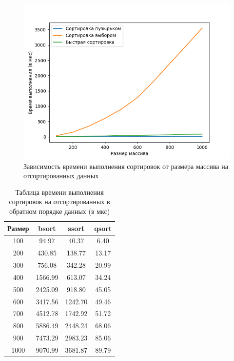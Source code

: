 \documentclass[12pt]{report}
\begin{document}
\begin{figure}[H]
	\centering
	\includegraphics[scale = 0.8]{dir.png}
	\caption{Зависимость времени выполнения сортировок от размера массива на отсортированных данных}
	\label{fig:mpr1}
\end{figure}

\begin{table} [H]
	\caption{Таблица времени выполнения сортировок на отсортированных в  обратном порядке данных (в мкс)}
	\label{t2}
	\begin{center}
	\begin{tabular}{|c c c c|}

		\hline

		Размер & bsort & ssort & qsort \\ [0.5ex]
\hline
100 & 94.97 & 40.37 & 6.40  \\ 
\hline
200 & 430.85 & 138.77 & 13.17  \\ 
\hline
300 & 756.08 & 342.28 & 20.99  \\ 
\hline
400 & 1566.99 & 613.07 & 34.24  \\ 
\hline
500 & 2425.09 & 918.80 & 45.05  \\ 
\hline
600 & 3417.56 & 1242.70 & 49.46  \\ 
\hline
700 & 4512.78 & 1742.92 & 51.72  \\ 
\hline
800 & 5886.49 & 2448.24 & 68.06  \\ 
\hline
900 & 7473.29 & 2983.23 & 85.06 \\
\hline
1000 & 9070.99 & 3681.87 & 89.79 \\
\hline

	\end{tabular}
	\end{center}
\end{table}
\end{document}
